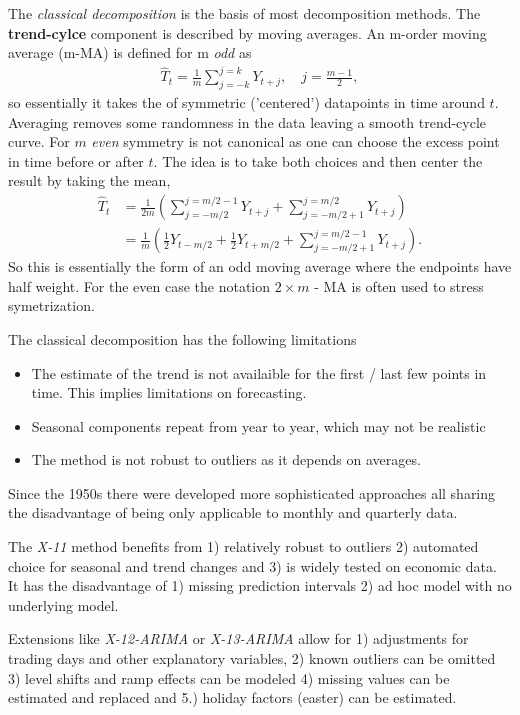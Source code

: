 \documentclass[12pt,a4paper]{article}
\begin{document}
The \textit{classical decomposition} is the basis of most decomposition methods. The \textbf{trend-cylce }component is described by moving averages. An m-order moving average (m-MA) is defined for m \textit{odd} as
\begin{align}
	\hat T_t = \frac{1}{m} \sum_{j=-k}^{j=k}Y_{t+j}, \quad j=\frac{m-1}{2},
\end{align} 
so essentially it takes the of symmetric ('centered') datapoints in time around $t$. Averaging removes some randomness in the data leaving a smooth trend-cycle curve. For $m$ \textit{even} symmetry is not canonical as one can choose the excess point in time before or after $t$. The idea is to take both choices and then center the result by taking the mean, 
\begin{align}
	\hat T_t &= \frac{1}{2m} \left( \sum_{j=-m/2}^{j=m/2-1}Y_{t+j} + \sum_{j=-m/2 + 1}^{j=m/2}Y_{t+j}  \right)  \\ 
	 & = \frac{1}{m} \left( \frac{1}{2} Y_{t-m/2} + \frac{1}{2}  Y_{t + m/2} + \sum_{j=-m/2 +1}^{j=m/2-1}Y_{t+j}  \right). 
\end{align} 
 So this is essentially the form of an odd moving average where the endpoints have half weight. For the even case the notation $2\times m$ - MA is often used to stress symetrization.
 
The classical decomposition has the following limitations
\begin{itemize}
	\item The estimate of the trend is not availaible for the first / last few points in time. This implies limitations on forecasting.
	\item Seasonal components repeat from year to year, which may not be realistic
	\item The method is not robust to outliers as it depends on averages.
\end{itemize}

Since the 1950s there were developed more sophisticated approaches all sharing the disadvantage of being only applicable to monthly and quarterly data.  

The \textit{X-11} method benefits from 1) relatively robust to outliers 2) automated choice for seasonal and trend changes and 3) is widely tested on economic data. It has the disadvantage of 1) missing prediction intervals 2) ad hoc model with no underlying model.

Extensions like \textit{X-12-ARIMA} or  \textit{X-13-ARIMA} allow for 1) adjustments for trading days and other explanatory variables, 2) known outliers can be omitted 3) level shifts and ramp effects can be modeled 4) missing values can be estimated and replaced and 5.) holiday factors (easter) can be estimated.
\end{document}
